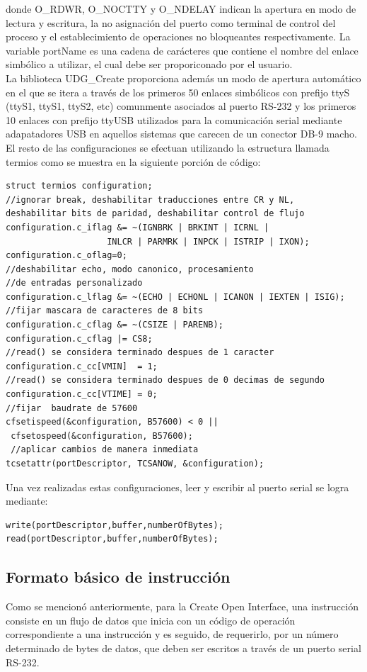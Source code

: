 \documentclass[letterpaper,openright,12pt]{book}
\begin{document}
donde O\_RDWR, O\_NOCTTY y O\_NDELAY indican la apertura en modo de lectura y escritura, la no asignación del puerto como terminal de control del proceso y el establecimiento de operaciones no bloqueantes respectivamente. La variable portName es una cadena de carácteres que contiene el nombre del enlace simbólico a utilizar, el cual debe ser proporiconado por el usuario.\\
La biblioteca UDG\_Create proporciona además un modo de apertura automático en el que se itera a través de los primeros 50 enlaces simbólicos con prefijo ttyS (ttyS1, ttyS1, ttyS2, etc) comunmente asociados al puerto RS-232 y los primeros 10 enlaces con prefijo ttyUSB utilizados para la comunicación serial mediante adapatadores USB en aquellos sistemas que carecen de un conector DB-9 macho.\\
El resto de las configuraciones se efectuan utilizando la estructura llamada termios como se muestra en la siguiente porción de código:
\begin{lstlisting}
struct termios configuration;
//ignorar break, deshabilitar traducciones entre CR y NL,
deshabilitar bits de paridad, deshabilitar control de flujo
configuration.c_iflag &= ~(IGNBRK | BRKINT | ICRNL |
                    INLCR | PARMRK | INPCK | ISTRIP | IXON);
configuration.c_oflag=0;
//deshabilitar echo, modo canonico, procesamiento 
//de entradas personalizado
configuration.c_lflag &= ~(ECHO | ECHONL | ICANON | IEXTEN | ISIG);
//fijar mascara de caracteres de 8 bits
configuration.c_cflag &= ~(CSIZE | PARENB);
configuration.c_cflag |= CS8;
//read() se considera terminado despues de 1 caracter
configuration.c_cc[VMIN]  = 1;
//read() se considera terminado despues de 0 decimas de segundo
configuration.c_cc[VTIME] = 0;
//fijar  baudrate de 57600
cfsetispeed(&configuration, B57600) < 0 ||
 cfsetospeed(&configuration, B57600);
 //aplicar cambios de manera inmediata
tcsetattr(portDescriptor, TCSANOW, &configuration);
\end{lstlisting}

Una vez realizadas estas configuraciones, leer y escribir al puerto serial se logra mediante:
\begin{lstlisting}
write(portDescriptor,buffer,numberOfBytes);
read(portDescriptor,buffer,numberOfBytes);
\end{lstlisting}

\subsection{Formato básico de instrucción}
Como se mencionó anteriormente, para la Create Open Interface, una instrucción consiste en un flujo de datos que inicia con un código de operación correspondiente a una instrucción y es seguido, de requerirlo, por un número determinado de bytes de datos, que deben ser escritos a través de un puerto serial RS-232.
\end{document}
